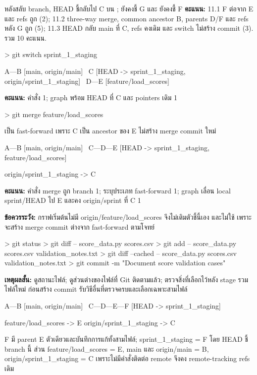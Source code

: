 หลังสลับ branch, HEAD ชี้กลับไป C บน ;  ยังคงชี้ G และ  ยังคงชี้ F
\textbf{คะแนน:} 11.1 F ต่อจาก E และ refs ถูก (2); 11.2 three-way merge, common ancestor B, parents D/F และ refs หลัง G ถูก (5); 11.3 HEAD กลับ main ที่ C, refs คงเดิม และ switch ไม่สร้าง commit (3). รวม 10 คะแนน.\par
\newpage
{}
\begin{gitpanel}
> git switch sprint_1_staging
\end{gitpanel}
\begin{gitpanel}
A---B [main, origin/main]
     \
      C [HEAD -> sprint_1_staging, origin/sprint_1_staging]
       \
        D---E [feature/load_scores]
\end{gitpanel}
\textbf{คะแนน:} คำสั่ง 1; graph พร้อม HEAD ที่ C และ pointers เดิม 1

\anshead{12.2 Merge}{3}
\begin{gitpanel}
> git merge feature/load_scores
\end{gitpanel}
เป็น fast-forward เพราะ C เป็น ancestor ของ E ไม่สร้าง merge commit ใหม่
\begin{gitpanel}
A---B [main, origin/main]
     \
      C---D---E [HEAD -> sprint_1_staging, feature/load_scores]

origin/sprint_1_staging -> C
\end{gitpanel}
\textbf{คะแนน:} คำสั่ง merge ถูก branch 1; ระบุประเภท fast-forward 1; graph เลื่อน local sprint/HEAD ไป E และคง origin/sprint ที่ C 1

\textbf{ข้อควรระวัง:} กราฟเริ่มต้นไม่มี origin/feature/load\_scores จึงไม่เติมตัวชี้นี้เอง และไม่ใช้  เพราะจะสร้าง merge commit ต่างจาก fast-forward ตามโจทย์
\newpage
{}
\begin{gitpanel}
> git status
> git diff -- score_data.py scores.csv
> git add -- score_data.py scores.csv validation_notes.txt
> git diff --cached -- score_data.py scores.csv validation_notes.txt
> git commit -m "Document score validation cases"
\end{gitpanel}
\textbf{เหตุผลสั้น:} \code{status} ดูสถานะไฟล์; \code{diff} ดูส่วนต่างของไฟล์ที่ Git ติดตามแล้ว;  ตรวจสิ่งที่เลือกไว้หลัง stage รวมไฟล์ใหม่ ก่อนสร้าง commit รับวิธีอื่นที่ตรวจครบและเลือกเฉพาะสามไฟล์

\begin{gitpanel}
A---B [main, origin/main]
     \
      C---D---E---F [HEAD -> sprint_1_staging]

feature/load_scores -> E
origin/sprint_1_staging -> C
\end{gitpanel}
F มี parent E ตัวเดียวและบันทึกการแก้ทั้งสามไฟล์; sprint\_1\_staging = F โดย HEAD ชี้ branch นี้ ส่วน feature/load\_scores = E, main และ origin/main = B, origin/sprint\_1\_staging = C เพราะไม่มีคำสั่งติดต่อ remote จึงคง remote-tracking refs เดิม

